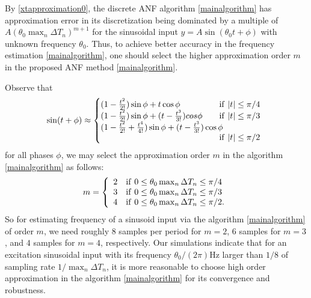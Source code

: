 \documentclass{UCF_ETD}
\begin{document}
 By \eqref{xtapproximation0}, the discrete ANF %
 algorithm \eqref{mainalgorithm}  has  approximation error in its discretization being dominated by
 a  multiple of $A(\theta_0\max_n \Delta T_n)^{m+1}$  for  the sinusoidal input $y= A\sin (\theta_0 t+\phi)$ with
 unknown frequency $\theta_0$.
 Thus, to achieve better accuracy in the frequency estimation \eqref{mainalgorithm},
   one should select the higher approximation order $m$ in the
proposed ANF method  \eqref{mainalgorithm}. %

Observe that
\begin{equation*}
\sin(t+\phi)\approx
\left\{\begin{array} {l} \! \! \!
 (1-\frac{t^2}{2!})\sin \phi+   t \cos \phi\qquad
\hfill  {\rm if} \ |t|\le \pi/4\\
 \!  \! \!(1-\frac{t^2}{2!})\sin \phi+  (t-\frac{t^3}{3!})cos \phi \qquad
\hfill  {\rm if} \ |t|\le \pi/3\\
 \! \! \! (1-\frac{t^2}{2!}+\frac{t^4}{4!})\sin \phi+  (t-\frac{t^3}{3!}) \cos \phi \\
 \hfill  {\rm if} \ |t|\le \pi/2
\end{array}
\right.
\end{equation*}
for all phases $\phi$, we may select the approximation order $m$  in the algorithm \eqref{mainalgorithm} as follows:
\begin{equation}\label{selectm}
m=
\left\{\begin{array}{ll} 2  & {\rm if}\  0\le \theta_0\max_n \Delta T_n\le \pi/4\\
3 & {\rm if} \ 0\le \theta_0\max_n \Delta T_n\le \pi/3\\
4 & {\rm if} \ 0\le \theta_0\max_n \Delta T_n\le \pi/2.
\end{array}\right.
\end{equation}
So for estimating frequency of a sinusoid input
via  the  algorithm \eqref{mainalgorithm} of order $m$,
we need roughly $8$ samples per period for $m=2$,
$6$ samples for $m=3$, and
$4$ samples for  $m=4$, respectively.
Our simulations  indicate that for an excitation sinusoidal input with its frequency $\theta_0/(2\pi)$Hz larger than $1/8$ of sampling rate $1/\max_n \Delta T_n$,
 it  is more reasonable to choose high order approximation in the algorithm   \eqref{mainalgorithm}
for its convergence  and robustness.
\end{document}
